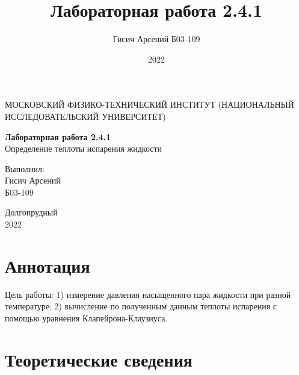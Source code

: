 \documentclass[a4paper, 12pt]{article}
\title{Лабораторная работа 2.4.1}
\author{Гисич Арсений Б03-109}
\date{2022}
\begin{document}
	\begin{center}
		{\large МОСКОВСКИЙ ФИЗИКО-ТЕХНИЧЕСКИЙ ИНСТИТУТ (НАЦИОНАЛЬНЫЙ ИССЛЕДОВАТЕЛЬСКИЙ УНИВЕРСИТЕТ)}
	\end{center}
	\vspace{5 cm}
	{\Large
		\begin{center}
			{\bf Лабораторная работа 2.4.1}\\[0.2 cm]
			Определение теплоты испарения жидкости
		\end{center}
	}
	\vspace{4 cm}
	\begin{flushright}
		{\Large Выполнил: \\
			\vspace{0.2 cm}
			Гисич Арсений \\
			\vspace{0.2 cm}
			Б03-109 \\}
	\end{flushright}
	\vspace{9 cm}
	\begin{center}
		Долгопрудный\\[0.1 cm]
		2022
	\end{center}
\thispagestyle{empty}

\section{Аннотация}

\par Цель работы: 1) измерение давления насыщенного пара жидкости при разной температуре; 2) вычисление по полученным данным теплоты испарения с помощью уравнения Клапейрона-Клаузиуса.

\section{Теоретические сведения}
\end{document}
